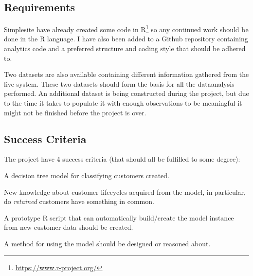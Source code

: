 

\subsection{Requirements}

Simplesite have already created some code in
R\footnote{\url{https://www.r-project.org/}} so any continued work should be
done in the R language. I have also been added to a Github repository containing
analytics code and a preferred structure and coding style that should be adhered
to.

Two datasets are also available containing different information gathered from
the live system. These two datasets should form the basis for all the
dataanalysis performed. An additional dataset is being constructed during the
project, but due to the time it takes to populate it with enough observations to
be meaningful it might not be finished before the project is over.


\subsection{Success Criteria}

The project have 4 success criteria (that should all be fulfilled to some
degree):

\begin{enumerate*}
  \item A decision tree model for classifying customers created.
  \item New knowledge about customer lifecycles acquired from the model,
        in particular, do \textit{retained} customers have something in common.
  \item A prototype R script that can automatically build/create the model
        instance from new customer data should be created.
  \item A method for using the model should be designed or reasoned about.
\end{enumerate*}
